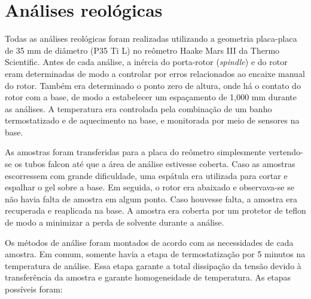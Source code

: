 		\section{Análises reológicas} 

		Todas as análises reológicas foram realizadas utilizando a geometria placa-placa de 35 mm de diâmetro (P35 Ti L) no reômetro Haake Mars III da Thermo Scientific. Antes de cada análise, a inércia do porta-rotor (\emph{spindle}) e do rotor eram determinadas de modo a controlar por erros relacionados ao encaixe manual do rotor. Também era determinado o ponto zero de altura, onde há o contato do rotor com a base, de modo a estabelecer um espaçamento de 1,000 mm durante as análises. A temperatura era controlada pela combinação de um banho termostatizado e de aquecimento na base, e monitorada por meio de sensores na base.
		
		As amostras foram transferidas para a placa do reômetro simplesmente vertendo-se os tubos falcon até que a área de análise estivesse coberta. Caso as amostras escorressem com grande dificuldade, uma espátula era utilizada para cortar e espalhar o gel sobre a base. Em seguida, o rotor era abaixado e observava-se se não havia falta de amostra em algum ponto. Caso houvesse falta, a amostra era recuperada e reaplicada na base. A amostra era coberta por um protetor de teflon de modo a minimizar a perda de solvente durante a análise.
		
		Os métodos de análise foram montados de acordo com as necessidades de cada amostra. Em comum, somente havia a etapa de termostatização por 5 minutos na temperatura de análise. Essa etapa garante a total dissipação da tensão devido à transferência da amostra e garante homogeneidade de temperatura. As etapas possíveis foram:
		
